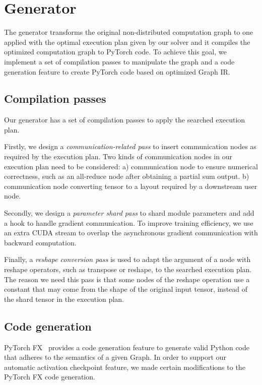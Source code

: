 \section{Generator}

The generator transforms the original non-distributed computation graph to one applied with the optimal execution plan given by our solver and it compiles the optimized computation graph to PyTorch code. To achieve this goal, we implement a set of compilation passes to manipulate the graph and a code generation feature to create PyTorch code based on optimized Graph IR.

\subsection{Compilation passes}

Our generator has a set of compilation passes to apply the searched execution plan.

Firstly, we design a \textit{communication-related pass} to insert communication nodes as required by the execution plan. Two kinds of communication nodes in our execution plan need to be considered: a) communication node to ensure numerical correctness, such as an all-reduce node after obtaining a partial sum output. b) communication node converting tensor to a layout required by a downstream user node.

Secondly, we design a \textit{parameter shard pass} to shard module parameters and add a hook to handle gradient communication. To improve training efficiency, we use an extra CUDA stream to overlap the asynchronous gradient communication with backward computation. \par

Finally, a \textit{reshape conversion pass} is used to adapt the argument of a node with reshape operators, such as transpose or reshape, to the searched execution plan. The reason we need this pass is that some nodes of the reshape operation use a constant that may come from the shape of the original input tensor, instead of the shard tensor in the execution plan.

\subsection{Code generation}

PyTorch FX~\cite{torch-fx} provides a code generation feature to generate valid Python code that adheres to the semantics of a given Graph. In order to support our automatic activation checkpoint feature, we made certain modifications to the PyTorch FX code generation.

